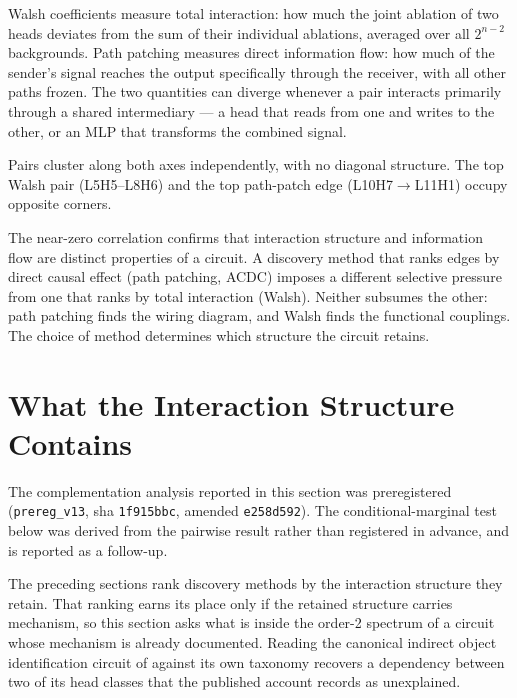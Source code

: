 \documentclass{article}
\begin{document}
Walsh coefficients measure total interaction: how much the joint
ablation of two heads deviates from the sum of their individual
ablations, averaged over all $2^{n-2}$ backgrounds. Path patching
measures direct information flow: how much of the sender's signal
reaches the output specifically through the receiver, with all other
paths frozen. The two quantities can diverge whenever a pair interacts
primarily through a shared intermediary --- a head that reads from one
and writes to the other, or an MLP that transforms the combined signal.

Pairs cluster along both axes independently, with no diagonal structure. The top Walsh pair
(L5H5--L8H6) and the top path-patch edge (L10H7$\to$L11H1) occupy
opposite corners.

The near-zero correlation confirms that interaction structure and
information flow are distinct properties of a circuit. A discovery method
that ranks edges by direct causal effect (path patching, ACDC) imposes a
different selective pressure from one that ranks by total interaction
(Walsh). Neither subsumes the other: path patching finds the wiring
diagram, and Walsh finds the functional couplings. The choice of method
determines which structure the circuit retains.




%
%


\section{What the Interaction Structure Contains}
\label{sec:what-epistasis-contains}

The complementation analysis reported in this section was preregistered (\texttt{prereg\_v13}, sha \texttt{1f915bbc}, amended \texttt{e258d592}). The conditional-marginal test below was derived from the pairwise result rather than registered in advance, and is reported as a follow-up.

The preceding sections rank discovery methods by the interaction structure they retain.
That ranking earns its place only if the retained structure carries mechanism, so this
section asks what is inside the order-2 spectrum of a circuit whose mechanism is already
documented. Reading the canonical indirect object identification circuit of
\citet{wang2022ioi} against its own taxonomy recovers a dependency between two of its head
classes that the published account records as unexplained.
\end{document}
